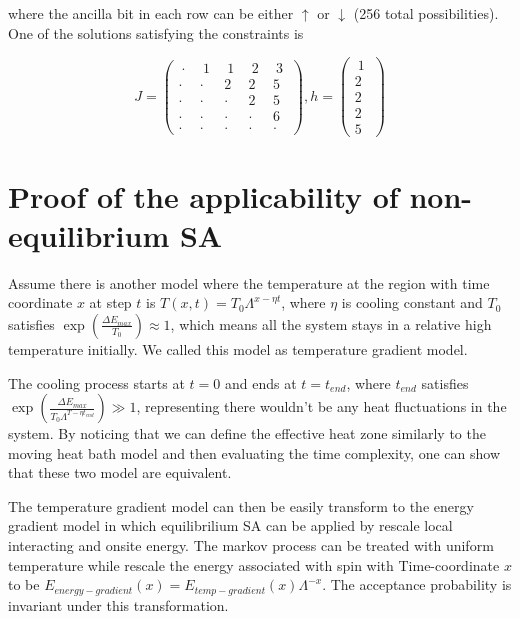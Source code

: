 \documentclass[twocolumn,superscriptaddress,english,showpacs,longbibliography]{revtex4-2}
\begin{document}
where the ancilla bit in each row can be either $\uparrow$ or
$\downarrow$ (256 total possibilities). One of the solutions
satisfying the constraints is

\begin{equation}
J = \begin{pmatrix}
~\cdot~ & ~1~ & ~1~ & ~2~ & ~3~\\
\cdot & \cdot & 2 & 2 & 5\\
\cdot & \cdot & \cdot & 2 & 5\\
\cdot & \cdot & \cdot & \cdot & 6\\
\cdot & \cdot & \cdot & \cdot & \cdot
\end{pmatrix}, h = \begin{pmatrix}
~1~\\
2\\
2\\
2\\
5
\end{pmatrix}
\end{equation}

\section{Proof of the applicability of non-equilibrium SA}\label{proof-of_non-equilibrium-SA}

Assume there is another model where the temperature at the region with 
time coordinate $x$ at step $t$ is $T(x, t) = T_0\Lambda^{x - \eta t}$, where 
$\eta$ is cooling constant and $T_0$ satisfies $\exp(\frac{\Delta E_{max}}{T_0})\approx 1$, 
which means all the system stays in a relative high temperature initially. 
We called this model as temperature gradient model.

The cooling process starts at $t=0$ and ends at $t=t_{end}$, where $t_{end}$ satisfies
$\exp(\frac{\Delta E_{max}}{T_0\Lambda^{T - \eta t_{end}}}) \gg 1$, representing there wouldn't be any heat
fluctuations in the system. By noticing that we can define the effective heat zone
similarly to the moving heat bath model and then evaluating the time complexity, one can show that these two model are
equivalent.

The temperature gradient model can then be easily transform to
the energy gradient model in which equilibrilium SA can be applied by rescale local interacting and onsite energy.
The markov process can be treated with uniform temperature while rescale the energy associated with spin with Time-coordinate $x$
to be $E_{energy-gradient}(x) = E_{temp-gradient}(x)\Lambda^{-x}$. The acceptance probability is
invariant under this transformation.
\end{document}
